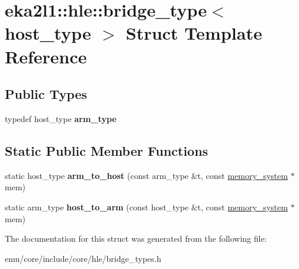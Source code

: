 \hypertarget{structeka2l1_1_1hle_1_1bridge__type}{}\section{eka2l1\+:\+:hle\+:\+:bridge\+\_\+type$<$ host\+\_\+type $>$ Struct Template Reference}
\label{structeka2l1_1_1hle_1_1bridge__type}
\subsection*{Public Types}
\begin{DoxyCompactItemize}
\item 
\mbox{\label{structeka2l1_1_1hle_1_1bridge__type_a9b8650fba86e5dee5402207186fbfd43}} 
typedef host\+\_\+type {\bfseries arm\+\_\+type}
\end{DoxyCompactItemize}
\subsection*{Static Public Member Functions}
\begin{DoxyCompactItemize}
\item 
\mbox{\label{structeka2l1_1_1hle_1_1bridge__type_ab32d32e625ece0d526b998faefbdf30c}} 
static host\+\_\+type {\bfseries arm\+\_\+to\+\_\+host} (const arm\+\_\+type \&t, const \mbox{\hyperlink{classeka2l1_1_1memory__system}{memory\+\_\+system}} $\ast$mem)
\item 
\mbox{\label{structeka2l1_1_1hle_1_1bridge__type_a43cc02499b15003e27dbba926b287356}} 
static arm\+\_\+type {\bfseries host\+\_\+to\+\_\+arm} (const host\+\_\+type \&t, const \mbox{\hyperlink{classeka2l1_1_1memory__system}{memory\+\_\+system}} $\ast$mem)
\end{DoxyCompactItemize}


The documentation for this struct was generated from the following file\+:\begin{DoxyCompactItemize}
\item 
emu/core/include/core/hle/bridge\+\_\+types.\+h\end{DoxyCompactItemize}
